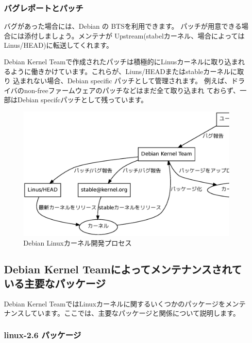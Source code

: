 \documentclass[mingoth,a4paper]{jsarticle}
\begin{document}
\subsubsection{バグレポートとパッチ}
バグがあった場合には、Debian の BTSを利用できます。
パッチが用意できる場合には添付しましょう。メンテナが
Upstream(stabelカーネル、場合によってはLinus/HEAD)に転送してくれます。

Debian Kernel Teamで作成されたパッチは積極的にLinusカーネルに取り込まれ
るように働きかけています。これらが、Liuns/HEADまたはstableカーネルに取り
込まれない場合、Debian specific パッチとして管理されます。
例えば、ドライバのnon-freeファームウェアのパッチなどはまだ全て取り込まれ
ておらず、一部はDebian specifcパッチとして残っています。

\begin{figure}[H]
\begin{center}
\includegraphics[width=1.0\hsize]{image201005/debian-kernel-devel.eps}
\caption{Debian Linuxカーネル開発プロセス}
\label{fig:debian-kernel-devel}
\end{center}
\end{figure}

\subsection{Debian Kernel Teamによってメンテナンスされている主要なパッケージ}

Debian Kernel TeamではLinuxカーネルに関するいくつかのパッケージをメンテ
ナンスしています。ここでは、主要なパッケージと関係について説明します。

\subsubsection{linux-2.6 パッケージ}
\end{document}
